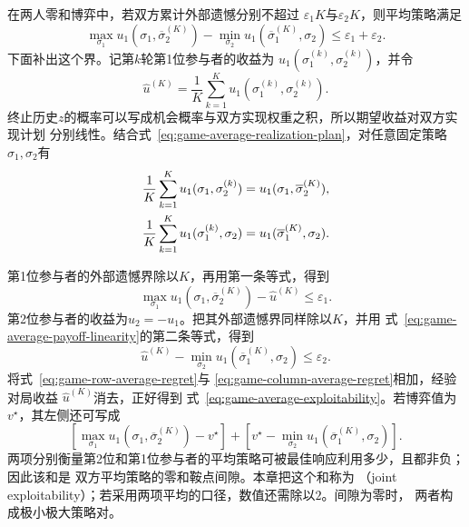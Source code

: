 在两人零和博弈中，若双方累计外部遗憾分别不超过
\(\varepsilon_1K\)与\(\varepsilon_2K\)，则平均策略满足
\begin{equation}
  \max_{\sigma_1}
  u_1(\sigma_1,\overline{\sigma}_2^{(K)})
  -
  \min_{\sigma_2}
  u_1(\overline{\sigma}_1^{(K)},\sigma_2)
  \leq
  \varepsilon_1+\varepsilon_2.
  \label{eq:game-average-exploitability}
\end{equation}
下面补出这个界。记第\(k\)轮第1位参与者的收益为
\(u_1(\sigma_1^{(k)},\sigma_2^{(k)})\)，并令
\[
  \widehat u^{(K)}
  =
  \frac{1}{K}
  \sum_{k=1}^{K}
  u_1(\sigma_1^{(k)},\sigma_2^{(k)}).
\]
终止历史\(z\)的概率可以写成机会概率与双方实现权重之积，所以期望收益对双方实现计划
分别线性。结合式~\eqref{eq:game-average-realization-plan}，对任意固定策略
\(\sigma_1,\sigma_2\)有
\begin{align}
  \frac{1}{K}\sum_{k=1}^{K}
  u_1(\sigma_1,\sigma_2^{(k)})
  &=
  u_1(\sigma_1,\overline{\sigma}_2^{(K)}),
  \notag\\
  \frac{1}{K}\sum_{k=1}^{K}
  u_1(\sigma_1^{(k)},\sigma_2)
  &=
  u_1(\overline{\sigma}_1^{(K)},\sigma_2).
  \label{eq:game-average-payoff-linearity}
\end{align}

第1位参与者的外部遗憾界除以\(K\)，再用第一条等式，得到
\begin{equation}
  \max_{\sigma_1}
  u_1(\sigma_1,\overline{\sigma}_2^{(K)})
  -
  \widehat u^{(K)}
  \leq
  \varepsilon_1.
  \label{eq:game-row-average-regret}
\end{equation}
第2位参与者的收益为\(u_2=-u_1\)。把其外部遗憾界同样除以\(K\)，并用
式~\eqref{eq:game-average-payoff-linearity}的第二条等式，得到
\begin{equation}
  \widehat u^{(K)}
  -
  \min_{\sigma_2}
  u_1(\overline{\sigma}_1^{(K)},\sigma_2)
  \leq
  \varepsilon_2.
  \label{eq:game-column-average-regret}
\end{equation}
将式~\eqref{eq:game-row-average-regret}与
\eqref{eq:game-column-average-regret}相加，经验对局收益
\(\widehat u^{(K)}\)消去，正好得到
式~\eqref{eq:game-average-exploitability}。若博弈值为\(v^\star\)，其左侧还可写成
\[
  \left[
    \max_{\sigma_1}u_1(\sigma_1,\overline{\sigma}_2^{(K)})-v^\star
  \right]
  +
  \left[
    v^\star-\min_{\sigma_2}u_1(\overline{\sigma}_1^{(K)},\sigma_2)
  \right].
\]
两项分别衡量第2位和第1位参与者的平均策略可被最佳响应利用多少，且都非负；因此该和是
双方平均策略的零和鞍点间隙。本章把这个和称为
（joint exploitability）；若采用两项平均的口径，数值还需除以\(2\)。间隙为零时，
两者构成极小极大策略对。

